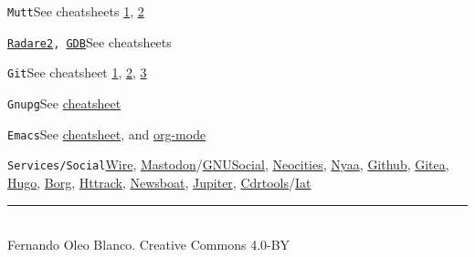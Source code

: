 \documentclass[12pt,landscape]{article}
\def\cm#1#2{{\tt#1}\dotfill#2\par}
\begin{document}
\begin{multicols}{3}
\cm{Mutt}{See cheatsheets \href{https://github.com/JoshuaEstes/CheatSheets/blob/master/mutt.md}{1}, \href{https://www.ucolick.org/~lharden/muttchart.html}{2}}

\cm{\href{https://github.com/zxgio/r2-cheatsheet/blob/master/r2-cheatsheet.pdf}{Radare2}, \href{https://github.com/zxgio/gdb-cheatsheet/blob/master/gdb-cheatsheet.pdf}{GDB}}{See cheatsheets}

\cm{Git}{See cheatsheet \href{http://www.cheat-sheets.org/saved-copy/git-cheat-sheet.pdf}{1}, \href{https://wikileaks.org/ciav7p1/cms/files/atlassian_git_cheatsheet.pdf}{2}, \href{http://ebixio.com/blog/wp-content/uploads/2011/09/git-qrc.pdf}{3}}

\cm{Gnupg}{See \href{http://stuff.imeos.org/persistent/gpg-cheatsheet.pdf}{cheatsheet}}

\cm{Emacs}{See \href{https://www.gnu.org/software/emacs/refcards/pdf/refcard.pdf}{cheatsheet}, and \href{https://orgmode.org/orgcard.pdf}{org-mode}}

\cm{Services/Social}{\href{https://github.com/wireapp}{Wire}, \href{https://github.com/tootsuite/mastodon}{Mastodon}/\href{https://gnu.io/}{GNUSocial}, \href{https://neocities.org/}{Neocities}, \href{https://nyaa.pantsu.cat/}{Nyaa}, \href{https://github.com/}{Github}, \href{https://gitea.io/en-US/}{Gitea}, \href{https://gohugo.io/}{Hugo}, \href{https://www.borgbackup.org/}{Borg}, \href{http://www.httrack.com/}{Httrack}, \href{https://newsboat.org/}{Newsboat}, \href{https://jupyter.org/}{Jupiter}, \href{http://cdrtools.sourceforge.net/private/cdrecord.html}{Cdrtools}/\href{http://iat.berlios.de/}{Iat}}

\vfill
\hrule
~\\
Fernando Oleo Blanco. Creative Commons 4.0-BY
\end{multicols}
\end{document}
